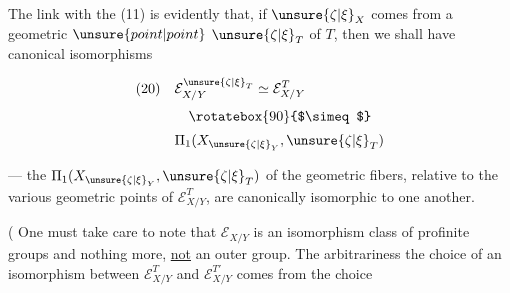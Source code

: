 
The link with the  (11) is evidently that, if $\unsure{\zeta|\xi}_X$ comes from a geometric $\unsure{point|point}$ $\unsure{\zeta|\xi}_T$ of $T$, then we shall have canonical isomorphisms

\[
\begin{aligned}
(20)\quad &\mathcal E_{X/Y}^{\unsure{\zeta|\xi}_T}\simeq\mathcal E_{X/Y}^T\\[0.5ex]
&\quad\rotatebox{90}{$\simeq$}\\[0.5ex]
&\Pi_1(X_{\unsure{\zeta|\xi}_Y},\unsure{\zeta|\xi}_T)
\end{aligned}
\]

 --- the $\Pi_1(X_{\unsure{\zeta|\xi}_Y},\unsure{\zeta|\xi}_T)$ of the geometric fibers, relative to the various geometric points of $\mathcal E_{X/Y}^T$, are canonically isomorphic to one another.

( One must take care to note that $\mathcal E_{X/Y}$  is an isomorphism class of profinite groups and nothing more, \uline{not} an outer group. The arbitrariness  the choice of an isomorphism between $\mathcal E_{X/Y}^T$ and $\mathcal E_{X/Y}^{T'}$ comes from the choice

